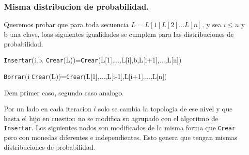 \documentclass[10pt,handout]{beamer}
\begin{document}
\section{}
\begin{frame}
\frametitle{Misma distribucion de probabilidad.}

Queremos probar que para toda secuencia $L=L[1]L[2]...L[n]$, y sea $i\leq n$ y b una clave,
loas siguientes igualidades se cumplem para las distribuciones de probabilidad.

\begin{centering}
  \texttt{Insertar}(i,b, \texttt{Crear}(L))=\texttt{Crear}(L[1],...,L[i],b,L[i+1],...,L[n])
\end{centering}

\begin{centering}
  \texttt{Borrar}(i \texttt{Crear}(L))=\texttt{Crear}(L[1],...,L[i-1],L[i+1],...,L[n])
\end{centering}

Dem primer caso, segundo caso analogo.

Por un lado en cada iteracion $l$ solo se cambia la topologia de ese nivel y que
hasta el hijo en cuestion no se modifica su agrupado con el algoritmo de \texttt{Insertar}.
Los siguientes nodos son modificados de la misma forma que \texttt{Crear} pero con
monedas diferentes e independientes.
Esto genera que tengan mismas distribuciones de probabilidad.

\end{frame}

\end{document}
